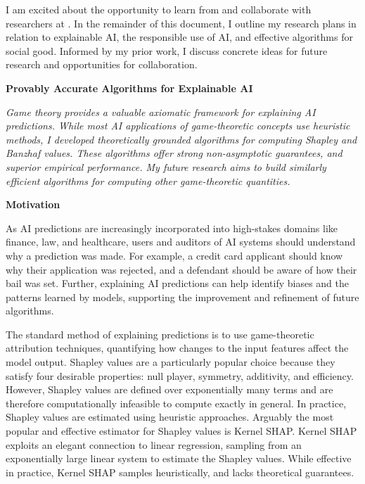 \documentclass[11pt]{article}
\begin{document}
{I am excited about the opportunity to learn from and collaborate with researchers at \school. In the remainder of this document, I outline my research plans in relation to explainable AI, the responsible use of AI, and effective algorithms for social good. Informed by my prior work, I discuss concrete ideas for future research and opportunities for collaboration.

\begin{center}
{ \large \textbf{Provably Accurate Algorithms for Explainable AI}}
\end{center}

\textit{Game theory provides a valuable axiomatic framework for explaining AI predictions. While most AI applications of game-theoretic concepts use heuristic methods, I developed theoretically grounded algorithms for computing Shapley and Banzhaf values.
These algorithms offer strong non-asymptotic guarantees, and superior empirical performance. My future research aims to build similarly efficient algorithms for computing other game-theoretic quantities.}

{ \large \textbf{Motivation}}

As AI predictions are increasingly incorporated into high-stakes domains like finance, law, and healthcare, users and auditors of AI systems should understand why a prediction was made. For example, a credit card applicant should know why their application was rejected, and a defendant should be aware of how their bail was set. 
Further, explaining AI predictions can help identify biases and the patterns learned by models, supporting the improvement and refinement of future algorithms.

The standard method of explaining predictions is to use game-theoretic attribution techniques, quantifying how changes to the input features affect the model output.
Shapley values are a particularly popular choice because they satisfy four desirable properties: null player, symmetry, additivity, and efficiency.
However, Shapley values are defined over exponentially many terms and are therefore computationally infeasible to compute exactly in general.
In practice, Shapley values are estimated using heuristic approaches.
Arguably the most popular and effective estimator for Shapley values is Kernel SHAP.
Kernel SHAP exploits an elegant connection to linear regression, sampling from an exponentially large linear system to estimate the Shapley values.
While effective in practice, Kernel SHAP samples heuristically, and lacks theoretical guarantees.

}
\end{document}
